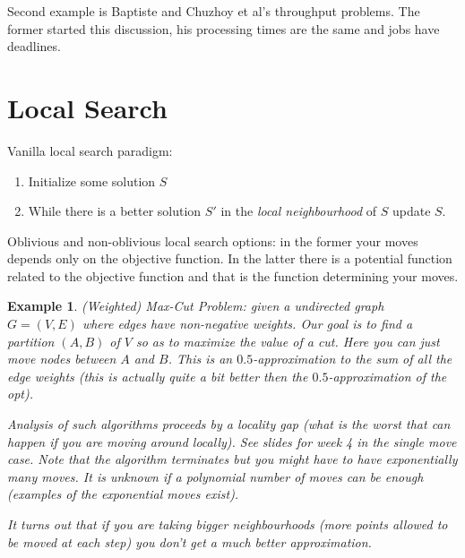 \documentclass[twoside]{article}
\newtheorem{example}[theorem]{Example}
\begin{document}
Second example is Baptiste and Chuzhoy et al's throughput problems. The former started this discussion, his processing times are the same and jobs have deadlines. 

\section{Local Search}
Vanilla local search paradigm:
\begin{enumerate}
\item Initialize some solution $S$
\item While there is a better solution $S'$ in the \emph{local neighbourhood} of $S$ update $S$.
\end{enumerate}

Oblivious and non-oblivious local search options: in the former your moves depends only on the objective function. In the latter there is a potential function related to the objective function and that is the function determining your moves.

\begin{example}
(Weighted) Max-Cut Problem: given a undirected graph $G = (V, E)$ where edges have non-negative weights. Our goal is to find a partition $(A, B)$ of $V$ so as to maximize the value of a cut. Here you can just move nodes between $A$ and $B$. This is an $0.5$-approximation to the sum of all the edge weights (this is actually quite a bit better then the $0.5$-approximation of the opt).

Analysis of such algorithms proceeds by a locality gap (what is the worst that can happen if you are moving around locally). See slides for week 4 in the single move case. Note that the algorithm terminates but you might have to have exponentially many moves. It is unknown if a polynomial number of moves can be enough (examples of the exponential moves exist).

It turns out that if you are taking bigger neighbourhoods (more points allowed to be moved at each step) you don't get a much better approximation.  
\end{example} 
\end{document}
